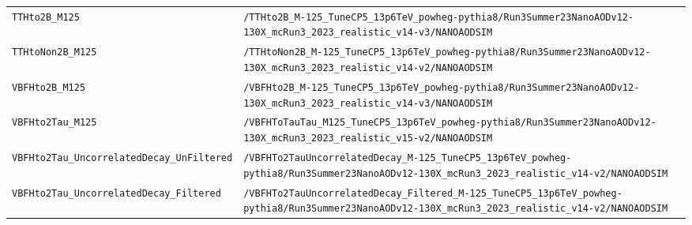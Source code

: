 \begin{longtable}{@{}>{\RaggedRight\arraybackslash}p{} >{\RaggedRight\arraybackslash}p{}@{}}
\addlinespace[2pt]
\texttt{TTHto2B\_\allowbreak{}M125} & \texttt{/\allowbreak{}TTHto2B\_\allowbreak{}M-\allowbreak{}125\_\allowbreak{}TuneCP5\_\allowbreak{}13p6TeV\_\allowbreak{}powheg-\allowbreak{}pythia8/\allowbreak{}Run3Summer23NanoAODv12-\allowbreak{}130X\_\allowbreak{}mcRun3\_\allowbreak{}2023\_\allowbreak{}realistic\_\allowbreak{}v14-\allowbreak{}v3/\allowbreak{}NANOAODSIM} \\
\addlinespace[2pt]
\texttt{TTHtoNon2B\_\allowbreak{}M125} & \texttt{/\allowbreak{}TTHtoNon2B\_\allowbreak{}M-\allowbreak{}125\_\allowbreak{}TuneCP5\_\allowbreak{}13p6TeV\_\allowbreak{}powheg-\allowbreak{}pythia8/\allowbreak{}Run3Summer23NanoAODv12-\allowbreak{}130X\_\allowbreak{}mcRun3\_\allowbreak{}2023\_\allowbreak{}realistic\_\allowbreak{}v14-\allowbreak{}v2/\allowbreak{}NANOAODSIM} \\
\addlinespace[2pt]
\texttt{VBFHto2B\_\allowbreak{}M125} & \texttt{/\allowbreak{}VBFHto2B\_\allowbreak{}M-\allowbreak{}125\_\allowbreak{}TuneCP5\_\allowbreak{}13p6TeV\_\allowbreak{}powheg-\allowbreak{}pythia8/\allowbreak{}Run3Summer23NanoAODv12-\allowbreak{}130X\_\allowbreak{}mcRun3\_\allowbreak{}2023\_\allowbreak{}realistic\_\allowbreak{}v14-\allowbreak{}v3/\allowbreak{}NANOAODSIM} \\
\addlinespace[2pt]
\texttt{VBFHto2Tau\_\allowbreak{}M125} & \texttt{/\allowbreak{}VBFHToTauTau\_\allowbreak{}M125\_\allowbreak{}TuneCP5\_\allowbreak{}13p6TeV\_\allowbreak{}powheg-\allowbreak{}pythia8/\allowbreak{}Run3Summer23NanoAODv12-\allowbreak{}130X\_\allowbreak{}mcRun3\_\allowbreak{}2023\_\allowbreak{}realistic\_\allowbreak{}v15-\allowbreak{}v2/\allowbreak{}NANOAODSIM} \\
\addlinespace[2pt]
\texttt{VBFHto2Tau\_\allowbreak{}UncorrelatedDecay\_\allowbreak{}UnFiltered} & \texttt{/\allowbreak{}VBFHTo2TauUncorrelatedDecay\_\allowbreak{}M-\allowbreak{}125\_\allowbreak{}TuneCP5\_\allowbreak{}13p6TeV\_\allowbreak{}powheg-\allowbreak{}pythia8/\allowbreak{}Run3Summer23NanoAODv12-\allowbreak{}130X\_\allowbreak{}mcRun3\_\allowbreak{}2023\_\allowbreak{}realistic\_\allowbreak{}v14-\allowbreak{}v2/\allowbreak{}NANOAODSIM} \\
\addlinespace[2pt]
\texttt{VBFHto2Tau\_\allowbreak{}UncorrelatedDecay\_\allowbreak{}Filtered} & \texttt{/\allowbreak{}VBFHTo2TauUncorrelatedDecay\_\allowbreak{}Filtered\_\allowbreak{}M-\allowbreak{}125\_\allowbreak{}TuneCP5\_\allowbreak{}13p6TeV\_\allowbreak{}powheg-\allowbreak{}pythia8/\allowbreak{}Run3Summer23NanoAODv12-\allowbreak{}130X\_\allowbreak{}mcRun3\_\allowbreak{}2023\_\allowbreak{}realistic\_\allowbreak{}v14-\allowbreak{}v2/\allowbreak{}NANOAODSIM} \\

\end{longtable}
